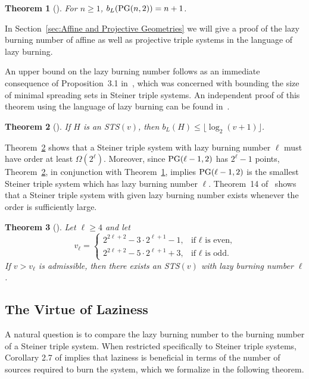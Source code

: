 \documentclass[12pt]{article}
\DeclareMathOperator{\PG}{\rm PG}
\newtheorem{theorem}{Theorem}[section]
\theoremstyle{definition}
\numberwithin{table}{section}
\begin{document}
\begin{theorem}[\cite{Zeitler1987}]
\label{thm:proj_lazy_solved}
For $n\geq 1$,
$b_L(\PG(n,2))=n+1$.
\end{theorem}

In Section~\ref{sec:Affine and Projective Geometries} we will give a proof of the lazy burning number of affine as well as projective triple systems in the language of lazy burning.

An upper bound on the lazy burning number follows as an immediate consequence of Proposition~3.1 in~\cite{NagySzemeredi}, which was concerned with bounding the size of minimal spreading sets in Steiner triple systems.  An independent proof of this theorem using the language of lazy burning can be found in~\cite{mythesis}.
\begin{theorem}[\cite{mythesis,NagySzemeredi}]
\label{lazy_upper_bound_sts}
If $H$ is an STS$(v)$, then $b_L(H)\leq \lfloor \log_2(v+1)\rfloor$.
\end{theorem}

Theorem~\ref{lazy_upper_bound_sts} shows that a Steiner triple system with lazy burning number $\ell$ must have order at least $\Omega(2^{\ell})$. Moreover, since $\PG(\ell-1,2)$ has $2^{\ell}-1$ points, Theorem~\ref{lazy_upper_bound_sts}, in conjunction with Theorem~\ref{thm:proj_lazy_solved}, implies $\PG(\ell-1,2)$ is the smallest Steiner triple system which has lazy burning number $\ell$. Theorem~14 of~\cite{Hilton1977} shows that a Steiner triple system with given lazy burning number exists whenever the order is sufficiently large.

\begin{theorem}[\cite{Hilton1977}]
\label{thm:AJWH1977}
Let $\ell \geq 4$ and let 
\[
v_\ell = \left\{ \begin{array}{ll} 
2^{2\ell+2} - 3 \cdot 2^{\ell+1} -1, & \mbox{if $\ell$ is even,} \\
2^{2\ell+2}-5\cdot 2^{\ell+1}+3, & \mbox{if $\ell$ is odd.}
\end{array}\right.
\]
If $v>v_\ell$ is admissible, then there exists an STS$(v)$ with lazy burning number $\ell$.
\end{theorem}



\subsection{The Virtue of Laziness}
A natural question is to compare the lazy burning number to the burning number of a Steiner triple system.  When restricted specifically to Steiner triple systems, Corollary 2.7 of \cite{introducing_hyp_burn} implies that laziness is beneficial in terms of the number of sources required to burn the system, which we formalize in the following theorem. 
\end{document}
